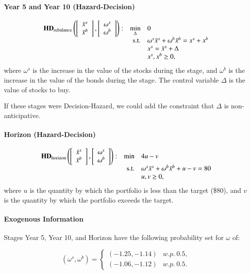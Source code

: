 \documentclass[final,1p,times]{elsarticle}
\newcommand{\twovec}[2]{\left[\begin{array}{c} #1 \\ #2 \end{array}\right]}
\begin{document}
\paragraph{Year 5 and Year 10 (Hazard-Decision)}
\begin{equation}
    \begin{array}{l r l}
        \text{\textbf{HD}}_{\text{rebalance}}\left(\twovec{\bar{x}^s}{\bar{x}^b}, \twovec{\omega^s}{\omega^b}\right): & \min\limits_{\Delta} & 0 \\
        & \text{s.t.} & \omega^s\bar{x}^s + \omega^b\bar{x}^b = x^s + x^b \\
         & & x^s = \bar{x}^s + \Delta\\
        & & x^s, x^b \ge 0,
    \end{array}
\end{equation}
where $\omega^s$ is the increase in the value of the stocks during the stage, and $\omega^b$ is the increase in the value of the bonds during the stage. The control variable $\Delta$ is the value of stocks to buy.

If these stages were Decision-Hazard, we could add the constraint that $\Delta$ is non-anticipative. 

\paragraph{Horizon (Hazard-Decision)}
\begin{equation}
    \begin{array}{l r l}
        \text{\textbf{HD}}_{\text{horizon}}\left(\twovec{\bar{x}^s}{\bar{x}^b}, \twovec{\omega^s}{\omega^b}\right): & \min & 4 u - v \\
        & \text{s.t.} & \omega^s\bar{x}^s + \omega^b\bar{x}^b + u - v = 80 \\
                & & u, v \ge 0,
    \end{array}
\end{equation}
where $u$ is the quantity by which the portfolio is less than the target (\$80), and $v$ is the quantity by which the portfolio exceeds the target.

\paragraph{Exogenous Information} Stages Year 5, Year 10, and Horizon have the following probability set for $\omega$ of:

\begin{equation}
    (\omega^s, \omega^b) = \begin{cases} 
      (-1.25, -1.14) & w.p.\ 0.5, \\
      (-1.06, -1.12) & w.p.\ 0.5.
   \end{cases}
\end{equation}
\end{document}
